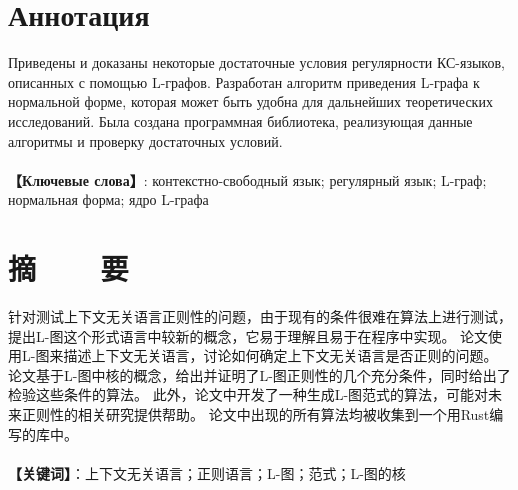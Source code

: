 \chapter*{Аннотация}

Приведены и доказаны некоторые достаточные условия регулярности КС-языков, описанных с помощью L-графов.
Разработан алгоритм приведения L-графа к нормальной форме, которая может быть удобна для дальнейших
теоретических исследований. 
Была создана программная библиотека, реализующая данные алгоритмы и проверку достаточных условий.
~ \\
~ \\
\textbf{【Ключевые слова】}: контекстно-свободный язык; регулярный язык; L-граф; нормальная форма; ядро L-графа
~ \\

\chapter*{摘~~~~要}

针对测试上下文无关语言正则性的问题，由于现有的条件很难在算法上进行测试，提出L-图这个形式语言中较新的概念，它易于理解且易于在程序中实现。
论文使用L-图来描述上下文无关语言，讨论如何确定上下文无关语言是否正则的问题。
论文基于L-图中核的概念，给出并证明了L-图正则性的几个充分条件，同时给出了检验这些条件的算法。
此外，论文中开发了一种生成L-图范式的算法，可能对未来正则性的相关研究提供帮助。
论文中出现的所有算法均被收集到一个用Rust编写的库中。
~ \\
~ \\
\textbf{【关键词】}：上下文无关语言；正则语言；L-图；范式；L-图的核

\pagebreak